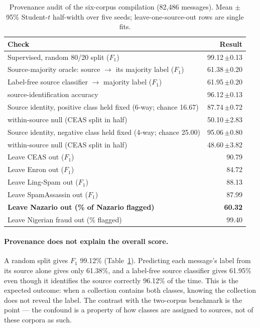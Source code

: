 \documentclass[twoside,11pt]{article}
\newcommand{\gd}[1]{\textbf{#1}}
\begin{document}
\begin{table}[t]
\centering\small
\caption{Provenance audit of the six-corpus compilation (82{,}486 messages).
Mean $\pm$ 95\% Student-$t$ half-width over five seeds; leave-one-source-out
rows are single fits.}
\label{tab:compilation}
\begin{tabular}{lr}
\toprule
Check & Result \\
\midrule
Supervised, random 80/20 split ($F_1$) & 99.12\,$\pm$0.13 \\
Source-majority oracle: source $\to$ its majority label ($F_1$) & 61.38\,$\pm$0.20 \\
Label-free source classifier $\to$ majority label ($F_1$) & 61.95\,$\pm$0.20 \\
\quad source-identification accuracy & 96.12\,$\pm$0.13 \\
\midrule
Source identity, positive class held fixed (6-way; chance 16.67) & 87.74\,$\pm$0.72 \\
\quad within-source null (CEAS split in half) & 50.10\,$\pm$2.83 \\
Source identity, negative class held fixed (4-way; chance 25.00) & 95.06\,$\pm$0.80 \\
\quad within-source null (CEAS split in half) & 48.60\,$\pm$3.82 \\
\midrule
Leave CEAS out ($F_1$) & 90.79 \\
Leave Enron out ($F_1$) & 84.72 \\
Leave Ling-Spam out ($F_1$) & 88.13 \\
Leave SpamAssassin out ($F_1$) & 87.99 \\
\gd{Leave Nazario out (\% of Nazario flagged)} & \gd{60.32} \\
Leave Nigerian fraud out (\% flagged) & 99.40 \\
\bottomrule
\end{tabular}
\end{table}

\paragraph{Provenance does not explain the overall score.}
A random split gives $F_1$ 99.12\% (Table~\ref{tab:compilation}). Predicting
each message's label from its source alone gives only 61.38\%, and a
label-free source classifier gives 61.95\% even though it identifies the
source correctly 96.12\% of the time. This is the expected outcome: when a
collection contains both classes, knowing the collection does not reveal the
label. The contrast with the two-corpus benchmark is the point --- the
confound is a property of how classes are assigned to sources, not of these
corpora as such.
\end{document}
